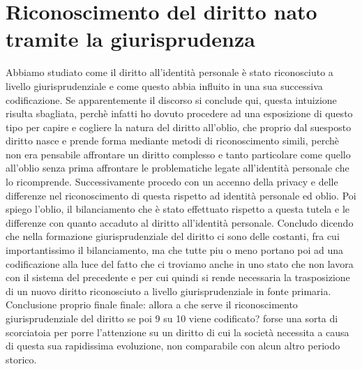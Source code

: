 \section{Riconoscimento del diritto nato tramite la giurisprudenza}
Abbiamo studiato come il diritto all'identità personale è stato riconosciuto a livello giurisprudenziale e come questo abbia influito in una sua successiva codificazione. Se apparentemente il discorso si conclude qui, questa intuizione risulta sbagliata, perchè infatti ho dovuto procedere ad una esposizione di questo tipo per capire e cogliere la natura del diritto all'oblio, che proprio dal suesposto diritto nasce e prende forma mediante metodi di riconoscimento simili, perchè non era pensabile affrontare un diritto complesso e tanto particolare come quello all'oblio senza prima affrontare le problematiche legate all'identità personale che lo ricomprende.
Successivamente procedo con un accenno della privacy e delle differenze nel riconoscimento di questa rispetto ad identità personale ed oblio.
Poi spiego l'oblio, il bilanciamento che è stato effettuato rispetto a questa tutela e le differenze con quanto accaduto al diritto all'identità personale.
Concludo dicendo che nella formazione giurisprudenziale del diritto ci sono delle costanti, fra cui importantissimo il bilanciamento, ma che tutte piu o meno portano poi ad una codificazione alla  luce del fatto che ci troviamo anche in uno stato che non  lavora con il sistema del precedente e per cui quindi si rende necessaria la trasposizione di un nuovo diritto riconosciuto a livello giurisprudenziale in fonte primaria.
Conclusione proprio finale finale: allora a che serve il riconoscimento giurisprudenziale del diritto se poi 9 su 10 viene codificato? forse una sorta di scorciatoia per porre l'attenzione su un diritto di cui  la società necessita a causa di questa sua rapidissima evoluzione, non  comparabile con alcun altro periodo storico.
